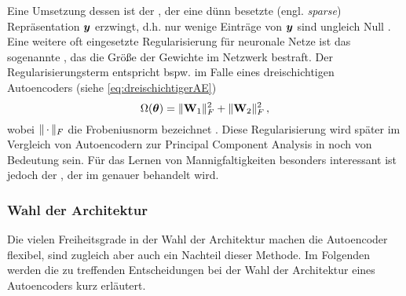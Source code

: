 Eine Umsetzung dessen ist der , der eine dünn besetzte (engl.
\textit{sparse}) Repräsentation $\bm{y}$ erzwingt, d.h. nur wenige Einträge von $\bm{y}$ sind
ungleich Null \parencite[505]{Goodfellow.2016}. Eine weitere oft eingesetzte Regularisierung für neuronale Netze ist
das sogenannte , das die Größe der Gewichte im Netzwerk bestraft. Der
Regularisierungsterm entspricht bspw. im Falle eines dreischichtigen Autoencoders (siehe
\eqref{eq:dreischichtigerAE})
\begin{equation}
	\label{eq:WeightDecay}
	\Omega(\bm{\theta}) = \lVert\mathbf{W}_1\rVert^2_F + \lVert\mathbf{W}_2\rVert^2_F \, ,
\end{equation}
wobei $\lVert\,\cdot\,\rVert_F$ die Frobeniusnorm bezeichnet \parencite[1]{Kunin.2019}. Diese Regularisierung wird später im Vergleich von Autoencodern zur
Principal Component Analysis in  noch von Bedeutung
sein. Für das Lernen von Mannigfaltigkeiten besonders interessant ist jedoch der
 \parencite{Rifai.2011a}, der im  genauer behandelt wird.

\subsubsection{Wahl der Architektur}
\label{ch:MethodenDerDimRed:ML:AE:WahlArchitektur}

Die vielen Freiheitsgrade in der Wahl der Architektur machen die Autoencoder flexibel, sind
zugleich aber auch ein Nachteil dieser Methode. Im Folgenden werden die zu treffenden
Entscheidungen bei der Wahl der Architektur eines Autoencoders kurz erläutert.

